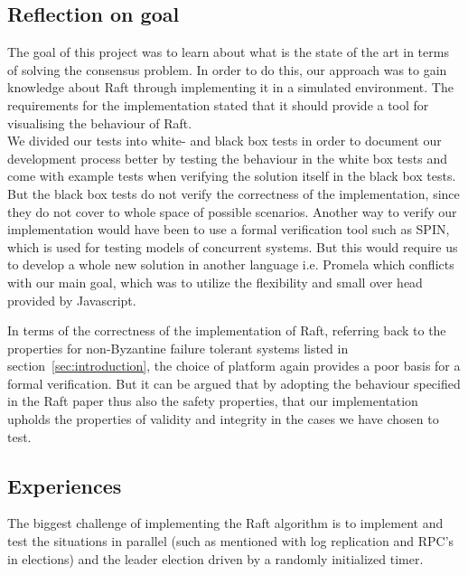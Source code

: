 \subsection{Reflection on goal}
The goal of this project was to learn about what is the state of the art in terms of solving the consensus problem. In order to do this, our approach was to gain knowledge about Raft through implementing it in a simulated environment.
The requirements for the implementation stated that it should provide a tool for visualising the behaviour of Raft. \\
We divided our tests into white- and black box tests in order to document our development process better by testing the behaviour in the white box tests and come with example tests when verifying the solution itself in the black box tests. But the black box tests do not verify the correctness of the implementation, since they do not cover to whole space of possible scenarios. Another way to verify our implementation would have been to use a formal verification tool such as SPIN, which is used for testing models of concurrent systems. But this would require us to develop a whole new solution in another language i.e. Promela which conflicts with our main goal, which was to utilize the flexibility and small over head provided by Javascript.

In terms of the correctness of the implementation of Raft, referring back to the properties for non-Byzantine failure tolerant systems listed in section~\ref{sec:introduction}, the choice of platform again provides a poor basis for a formal verification. But it can be argued that by adopting the behaviour specified in the Raft paper thus also the safety properties, that our implementation upholds the properties of validity and integrity in the cases we have chosen to test.

\subsection{Experiences}

The biggest challenge of implementing the Raft algorithm is to implement and test the situations in parallel (such as mentioned with log replication and RPC's in elections) and the leader election driven by a randomly initialized timer.

